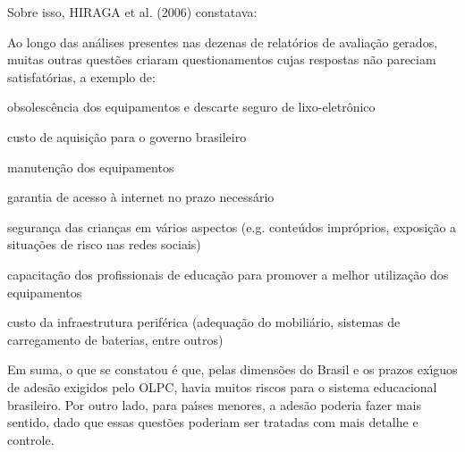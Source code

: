 \documentclass[
12pt,		%
openright,	%
twoside,  %
a4paper,			%
chapter=TITLE,		%
english,			%
french,				%
spanish,			%
brazil				%
]{USPSC-classe/USPSC}
\begin{document}
Sobre isso,  HIRAGA et al. (2006) constatava:











\noindent\begin{center}\mbox{\centering{}}\end{center}


Ao longo das an\'alises presentes nas dezenas de relat\'orios de avalia\c{c}\~ao gerados, muitas outras quest\~oes criaram questionamentos cujas respostas n\~ao pareciam satisfat\'orias, a exemplo de:











\begin{alineas}
\item obsolesc\^encia dos equipamentos e descarte seguro de lixo-eletr\^onico
\item custo de aquisi\c{c}\~ao para o governo brasileiro
\item manuten\c{c}\~ao dos equipamentos
\item garantia de acesso \`a internet no prazo necess\'ario
\item seguran\c{c}a das crian\c{c}as em v\'arios aspectos (e.g. conte\'udos impr\'oprios, exposi\c{c}\~ao a situa\c{c}\~oes de risco nas redes sociais)
\item capacita\c{c}\~ao dos profissionais de educa\c{c}\~ao para promover a melhor utiliza\c{c}\~ao dos equipamentos
\item custo da infraestrutura perif\'erica (adequa\c{c}\~ao do mobili\'ario, sistemas de carregamento de baterias, entre outros)
\end{alineas}

Em suma, o que se constatou \'e que, pelas dimens\~oes do Brasil e os prazos ex\'{\i}guos de ades\~ao exigidos pelo OLPC, havia muitos riscos para o sistema educacional brasileiro. Por outro lado, para pa\'{\i}ses menores, a ades\~ao poderia fazer mais sentido, dado que essas quest\~oes poderiam ser tratadas com mais detalhe e controle.
\end{document}

